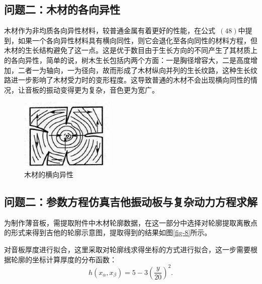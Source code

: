 \documentclass[withoutpreface,bwprint]{cumcmthesis} %
\begin{document}
\subsection{问题二：木材的各向异性}
木材作为非均质各向异性材料，较普通金属有着更好的性能，在公式~$(48)$中提到，如果一个各向异性材料具有横向同性，则它会退化至各向同性的材料方程，但木材的生长结构避免了这一点。这是优于数目由于生长方向的不同产生了其材质上的各向异性，简单的说，树木生长包括内两个方面：一是胸径增容大，二是高度增加，二者一为轴向，一为径向，故而形成了木材纵向并列的生长纹路，这种生长纹路进一步影响了木材受力时的变形程度。这导致普通的木材不会出现横向同性的情况，让音板的振动变得更为复杂，音色更为宽广。
\begin{figure}
    \centering
    \includegraphics[width=0.5\linewidth]{CUMCMThesis-master/figures/mucai.jpg}
    \caption{木材的横向异性}
    \label{fig:enter-label}
\end{figure}
\subsection{问题二：参数方程仿真吉他振动板与复杂动力方程求解}
为制作薄音板，需提取附件中木材轮廓数据，在这一部分中选择对轮廓提取离散点的形式来得到吉他的轮廓示意图，提取得到的结果如图\ref{fig-8}所示。


对音板厚度进行拟合，这里采取对轮廓线求得坐标的方式进行拟合，这一步需要根据轮廓的坐标计算厚度的分布函数：
\begin{equation}
h\left(x_\alpha,x_\beta\right)=5-3\left(\frac{y}{20}\right)^2.
\end{equation}
\end{document}
